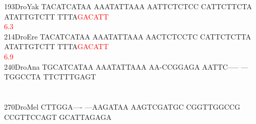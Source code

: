 \documentclass[11pt,twoside,reqno,a4paper]{article}
\begin{document}
{193\hspace*{1\charwidth}DroYak	TACATCATAA	AAATATTAAA	AATTCTCTCC	CATTCTTCTA	ATATTGTCTT	TTTA\textcolor{Red}{G}\textcolor{Red}{A}\textcolor{Red}{C}\textcolor{Red}{A}\textcolor{Red}{T}\textcolor{Red}{T}	\\
\hspace*{4\charwidth}\hspace*{7\charwidth}\hspace*{1\charwidth}\hspace*{1\charwidth}\hspace*{1\charwidth}\hspace*{1\charwidth}\hspace*{1\charwidth}\hspace*{54\charwidth}\textcolor{Red}{6.3}\hspace*{1\charwidth}\\
214\hspace*{1\charwidth}DroEre	TACATCATAA	AAATATTAAA	AACTCTCCTC	CATTCTCTTA	ATATTGTCTT	TTTA\textcolor{Red}{G}\textcolor{Red}{A}\textcolor{Red}{C}\textcolor{Red}{A}\textcolor{Red}{T}\textcolor{Red}{T}	\\
\hspace*{4\charwidth}\hspace*{7\charwidth}\hspace*{1\charwidth}\hspace*{1\charwidth}\hspace*{1\charwidth}\hspace*{1\charwidth}\hspace*{1\charwidth}\hspace*{54\charwidth}\textcolor{Red}{6.9}\hspace*{1\charwidth}\\
240\hspace*{1\charwidth}DroAna	TGCATCATAA	AAATATTAAA	AA-CCGGAGA	AATTC-----	---TGGCCTA	TTCTTTGAGT	\\
\hspace*{4\charwidth}\hspace*{7\charwidth}\hspace*{1\charwidth}\hspace*{1\charwidth}\hspace*{1\charwidth}\hspace*{1\charwidth}\hspace*{1\charwidth}\hspace*{1\charwidth}\\
\\
270\hspace*{1\charwidth}DroMel	CTTGGA----	---AAGATAA	AAGTCGATGC	CGGTTGGCCG	CCGTTCCAGT	GCATTAGAGA	\\
}
\end{document}
